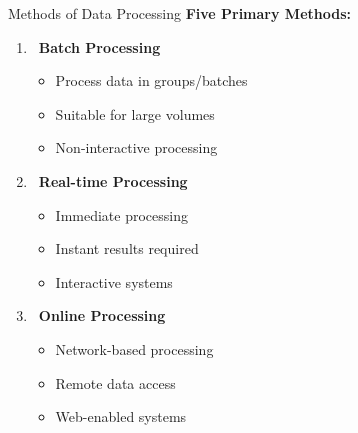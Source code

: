 \documentclass[aspectratio=169]{beamer}
\begin{document}
\begin{frame}{Methods of Data Processing}
    \textbf{Five Primary Methods:}
    
    \begin{enumerate}
        \item \faStream\, \textbf{Batch Processing}
        \begin{itemize}
            \item Process data in groups/batches
            \item Suitable for large volumes
            \item Non-interactive processing
        \end{itemize}
        
        \item \faClock\, \textbf{Real-time Processing}
        \begin{itemize}
            \item Immediate processing
            \item Instant results required
            \item Interactive systems
        \end{itemize}
        
        \item \faGlobe\, \textbf{Online Processing}
        \begin{itemize}
            \item Network-based processing
            \item Remote data access
            \item Web-enabled systems
        \end{itemize}
    \end{enumerate}
\end{frame}
\end{document}
